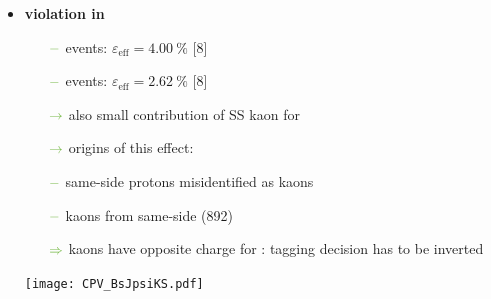 {\begin{minipage}{0.474\boxwidth}
\begin{itemize}

\item\textbf{\CP violation in \BsToJPsiKS}
	\begin{itemize}
	\setlength\itemsep{0.01em}
	\setlength{\itemindent}{-.11in}
	\item[${\color{tu_gruen}-}$] \Bs events: $\varepsilon_\text{eff}=\SI{4.00}{\%}$ [8]
	\item[${\color{tu_gruen}-}$] \Bd events: $\varepsilon_\text{eff}=\SI{2.62}{\%}$ [8]
	\setlength{\itemindent}{.05in}
	\item[${\color{tu_gruen}\rightarrow}$] also small contribution of SS kaon for \Bd
	\item[${\color{tu_gruen}\rightarrow}$] origins of this effect:
	\setlength{\itemindent}{.10in}
	\item[${\color{tu_gruen}-}$] same-side protons misidentified as kaons
	\item[${\color{tu_gruen}-}$] kaons from same-side \Kstar(892) 
	\setlength{\itemindent}{.05in}
	\item[${\color{tu_gruen}\Rightarrow}$] kaons have opposite charge for \Bd: tagging decision has to be inverted
	\end{itemize}

\vspace{-1.9em}
\begin{center}
\texttt{[image: CPV\_BsJpsiKS.pdf]}
\end{center}
%
%
\end{itemize}

\end{minipage}
\vspace{-0.5em}
}

